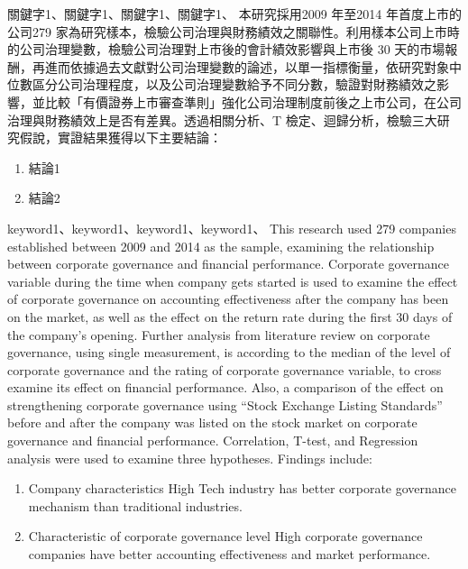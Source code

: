 \documentclass[writingLanguage=chinese,
    addPageTitle=on,
    addDeclaration=on,
    addMUSTlog=off,
    addFigTOC=on,   
    addTabTOC=on,
    refIndent=off,
    printMod=off,
]{.def/must}
\begin{document}
\begin{abstract@cn}{關鍵字1、關鍵字1、關鍵字1、關鍵字1、}
本研究採用2009 年至2014 年首度上市的公司279 家為研究樣本，檢驗公司治理與財務績效之關聯性。利用樣本公司上市時的公司治理變數，檢驗公司治理對上市後的會計績效影響與上市後 30 天的市場報酬，再進而依據過去文獻對公司治理變數的論述，以單一指標衡量，依研究對象中位數區分公司治理程度，以及公司治理變數給予不同分數，驗證對財務績效之影響，並比較「有價證券上市審查準則」強化公司治理制度前後之上市公司，在公司治理與財務績效上是否有差異。透過相關分析、T 檢定、迴歸分析，檢驗三大研究假說，實證結果獲得以下主要結論： 
\begin{enumerate}[label=\arabic*).]
\item 結論1
\item 結論2 
\end{enumerate}
\end{abstract@cn}

\begin{abstract@en}{keyword1、keyword1、keyword1、keyword1、}
This research used 279 companies established between 2009 and 2014 as the
sample, examining the relationship between corporate governance and financial
performance. Corporate governance variable during the time when company
gets started is used to examine the effect of corporate governance on accounting
effectiveness after the company has been on the market, as well as the effect on
the return rate during the first 30 days of the company’s opening. Further
analysis from literature review on corporate governance, using single
measurement, is according to the median of the level of corporate governance
and the rating of corporate governance variable, to cross examine its effect on
financial performance. Also, a comparison of the effect on strengthening
corporate governance using “Stock Exchange Listing Standards” before and
after the company was listed on the stock market on corporate governance and
financial performance. Correlation, T-test, and Regression analysis were used to
examine three hypotheses. Findings include:
\begin{enumerate}[label=\roman*).]
    \item Company characteristics
High Tech industry has better corporate governance mechanism than traditional
industries.
  \item Characteristic of corporate governance level
High corporate governance companies have better accounting effectiveness and
market performance.
\end{enumerate}
\end{abstract@en}
\end{document}
